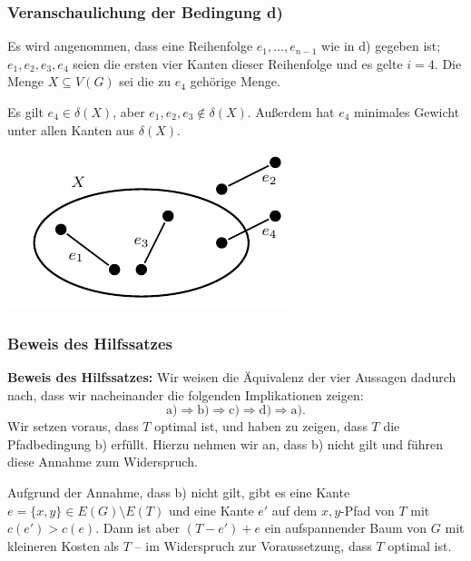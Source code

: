 \documentclass[smaller]{beamer}
\begin{document}
\begin{frame}
\frametitle{Veranschaulichung der Bedingung d)}
 Es wird angenommen, dass eine Reihenfolge $e_1,\ldots,e_{n-1}$ wie in d) gegeben ist; $e_1,e_2,e_3,e_4$ seien die ersten vier Kanten dieser Reihenfolge und es gelte $i=4$. Die Menge $X \subseteq V(G)$ sei die zu $e_4$ gehörige Menge. \\ \vspace*{0.2cm}
 
 Es gilt $e_4 \in \delta(X)$, aber $e_1,e_2,e_3 \notin \delta(X)$. Außerdem hat $e_4$ minimales Gewicht unter allen Kanten aus $\delta(X)$.
 
\begin{center}
 \includegraphics{fig85.pdf}
\end{center}
\end{frame}

\begin{frame}
\frametitle{Beweis des Hilfssatzes}
\textbf{Beweis des Hilfssatzes:} Wir weisen die Äquivalenz der vier Aussagen dadurch nach, dass wir nacheinander die folgenden Implikationen zeigen:
 \begin{equation*}
 \text{a)} \Rightarrow \text{b)} \Rightarrow \text{c)} \Rightarrow \text{d)} \Rightarrow \text{a)}.
 \end{equation*}
 \medskip
{} Wir setzen voraus, dass $T$ optimal ist, und haben zu zeigen, dass $T$ die Pfadbedingung b) erfüllt. Hierzu nehmen wir an, dass \alert{b) nicht gilt und führen diese Annahme zum Widerspruch.} \medskip

Aufgrund der Annahme, dass b) nicht gilt, gibt es eine Kante $e=\{x,y\} \in E(G) \setminus E(T)$ und eine Kante $e'$ auf dem $x,y$-Pfad von $T$ mit $c(e') > c(e)$. Dann ist aber $(T-e')+e$ ein aufspannender Baum von $G$ mit kleineren Kosten als $T$ -- im Widerspruch zur Voraussetzung, dass $T$ optimal ist.

\end{frame}
\end{document}
